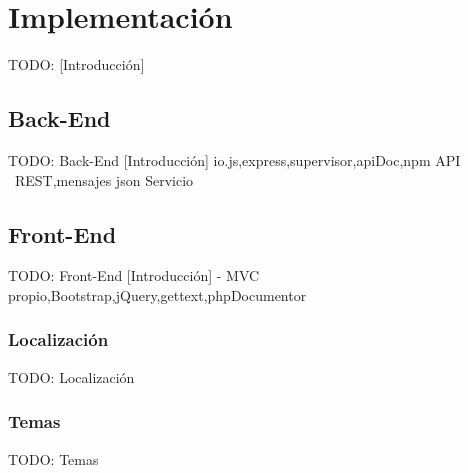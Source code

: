 \chapter{Implementación\label{cap:implementacion}}

TODO: [Introducción]


\section{Back-End\label{sec:imp:back_end}}

TODO: Back-End
  [Introducción]
  {io.js,express,supervisor,apiDoc,npm}
  {API ~REST,mensajes json}
  {Servicio}


\section{Front-End\label{sec:imp:front_end}}

TODO: Front-End
  [Introducción]
  - {MVC propio,Bootstrap,jQuery,gettext,phpDocumentor}


\subsection{Localización\label{ssec:imp:localizacion}}

TODO: Localización


\subsection{Temas\label{ssec:imp:temas}}

TODO: Temas